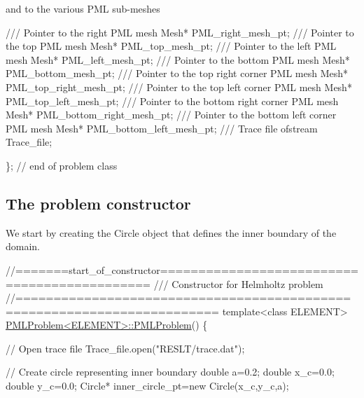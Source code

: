and to the various P\+ML sub-\/meshes


\begin{DoxyCodeInclude}
 \textcolor{comment}{/// Pointer to the right PML mesh}
 Mesh* PML\_right\_mesh\_pt;
\textcolor{comment}{}
\textcolor{comment}{ /// Pointer to the top PML mesh}
\textcolor{comment}{} Mesh* PML\_top\_mesh\_pt;
\textcolor{comment}{}
\textcolor{comment}{ /// Pointer to the left PML mesh}
\textcolor{comment}{} Mesh* PML\_left\_mesh\_pt;
\textcolor{comment}{}
\textcolor{comment}{ /// Pointer to the bottom PML mesh}
\textcolor{comment}{} Mesh* PML\_bottom\_mesh\_pt;
\textcolor{comment}{}
\textcolor{comment}{ /// Pointer to the top right corner PML mesh}
\textcolor{comment}{} Mesh* PML\_top\_right\_mesh\_pt;
\textcolor{comment}{}
\textcolor{comment}{ /// Pointer to the top left corner PML mesh}
\textcolor{comment}{} Mesh* PML\_top\_left\_mesh\_pt;
\textcolor{comment}{}
\textcolor{comment}{ /// Pointer to the bottom right corner PML mesh}
\textcolor{comment}{} Mesh* PML\_bottom\_right\_mesh\_pt;
\textcolor{comment}{}
\textcolor{comment}{ /// Pointer to the bottom left corner PML mesh}
\textcolor{comment}{} Mesh* PML\_bottom\_left\_mesh\_pt;
\textcolor{comment}{}
\textcolor{comment}{ /// Trace file}
\textcolor{comment}{} ofstream Trace\_file;

\}; \textcolor{comment}{// end of problem class}

\end{DoxyCodeInclude}
\hypertarget{index_constr}{}\subsection{The problem constructor}\label{index_constr}
We start by creating the {\ttfamily Circle} object that defines the inner boundary of the domain.

 
\begin{DoxyCodeInclude}
\textcolor{comment}{//=======start\_of\_constructor=============================================}
\textcolor{comment}{/// Constructor for Helmholtz problem}
\textcolor{comment}{}\textcolor{comment}{//========================================================================}
\textcolor{keyword}{template}<\textcolor{keyword}{class} ELEMENT>
\hyperlink{classPMLProblem_ae6cc833e2485ad6d37d6dd14105bf407}{PMLProblem<ELEMENT>::PMLProblem}()
\{

 \textcolor{comment}{// Open trace file}
 Trace\_file.open(\textcolor{stringliteral}{"RESLT/trace.dat"});

 \textcolor{comment}{// Create circle representing inner boundary}
 \textcolor{keywordtype}{double} a=0.2;
 \textcolor{keywordtype}{double} x\_c=0.0;
 \textcolor{keywordtype}{double} y\_c=0.0;
 Circle* inner\_circle\_pt=\textcolor{keyword}{new} Circle(x\_c,y\_c,a);

\end{DoxyCodeInclude}



